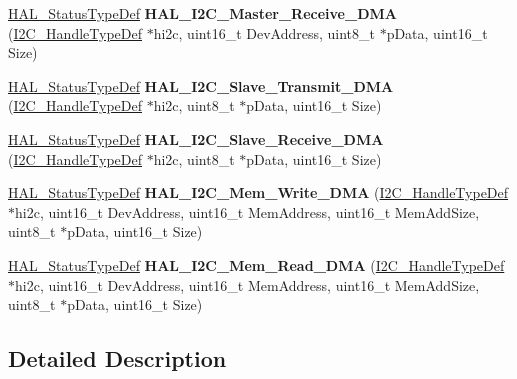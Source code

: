 \begin{DoxyCompactItemize}
\item 
\hypertarget{group___i2_c___exported___functions___group2_ga299f5e16a92826b9856c60265bc22cf2}{\hyperlink{stm32l1xx__hal__def_8h_a63c0679d1cb8b8c684fbb0632743478f}{H\-A\-L\-\_\-\-Status\-Type\-Def} {\bfseries H\-A\-L\-\_\-\-I2\-C\-\_\-\-Master\-\_\-\-Receive\-\_\-\-D\-M\-A} (\hyperlink{struct_i2_c___handle_type_def}{I2\-C\-\_\-\-Handle\-Type\-Def} $\ast$hi2c, uint16\-\_\-t Dev\-Address, uint8\-\_\-t $\ast$p\-Data, uint16\-\_\-t Size)}\label{group___i2_c___exported___functions___group2_ga299f5e16a92826b9856c60265bc22cf2}

\item 
\hypertarget{group___i2_c___exported___functions___group2_ga59e69e0da57150f980deea0d235f0397}{\hyperlink{stm32l1xx__hal__def_8h_a63c0679d1cb8b8c684fbb0632743478f}{H\-A\-L\-\_\-\-Status\-Type\-Def} {\bfseries H\-A\-L\-\_\-\-I2\-C\-\_\-\-Slave\-\_\-\-Transmit\-\_\-\-D\-M\-A} (\hyperlink{struct_i2_c___handle_type_def}{I2\-C\-\_\-\-Handle\-Type\-Def} $\ast$hi2c, uint8\-\_\-t $\ast$p\-Data, uint16\-\_\-t Size)}\label{group___i2_c___exported___functions___group2_ga59e69e0da57150f980deea0d235f0397}

\item 
\hypertarget{group___i2_c___exported___functions___group2_gad9dd42a10e5c108e30e6546cb64639c2}{\hyperlink{stm32l1xx__hal__def_8h_a63c0679d1cb8b8c684fbb0632743478f}{H\-A\-L\-\_\-\-Status\-Type\-Def} {\bfseries H\-A\-L\-\_\-\-I2\-C\-\_\-\-Slave\-\_\-\-Receive\-\_\-\-D\-M\-A} (\hyperlink{struct_i2_c___handle_type_def}{I2\-C\-\_\-\-Handle\-Type\-Def} $\ast$hi2c, uint8\-\_\-t $\ast$p\-Data, uint16\-\_\-t Size)}\label{group___i2_c___exported___functions___group2_gad9dd42a10e5c108e30e6546cb64639c2}

\item 
\hypertarget{group___i2_c___exported___functions___group2_ga12a2a86be393359534f630cdd090d8bb}{\hyperlink{stm32l1xx__hal__def_8h_a63c0679d1cb8b8c684fbb0632743478f}{H\-A\-L\-\_\-\-Status\-Type\-Def} {\bfseries H\-A\-L\-\_\-\-I2\-C\-\_\-\-Mem\-\_\-\-Write\-\_\-\-D\-M\-A} (\hyperlink{struct_i2_c___handle_type_def}{I2\-C\-\_\-\-Handle\-Type\-Def} $\ast$hi2c, uint16\-\_\-t Dev\-Address, uint16\-\_\-t Mem\-Address, uint16\-\_\-t Mem\-Add\-Size, uint8\-\_\-t $\ast$p\-Data, uint16\-\_\-t Size)}\label{group___i2_c___exported___functions___group2_ga12a2a86be393359534f630cdd090d8bb}

\item 
\hypertarget{group___i2_c___exported___functions___group2_gab25b99552182d2486d8eb441fffdd0a4}{\hyperlink{stm32l1xx__hal__def_8h_a63c0679d1cb8b8c684fbb0632743478f}{H\-A\-L\-\_\-\-Status\-Type\-Def} {\bfseries H\-A\-L\-\_\-\-I2\-C\-\_\-\-Mem\-\_\-\-Read\-\_\-\-D\-M\-A} (\hyperlink{struct_i2_c___handle_type_def}{I2\-C\-\_\-\-Handle\-Type\-Def} $\ast$hi2c, uint16\-\_\-t Dev\-Address, uint16\-\_\-t Mem\-Address, uint16\-\_\-t Mem\-Add\-Size, uint8\-\_\-t $\ast$p\-Data, uint16\-\_\-t Size)}\label{group___i2_c___exported___functions___group2_gab25b99552182d2486d8eb441fffdd0a4}

\end{DoxyCompactItemize}


\subsection{Detailed Description}
